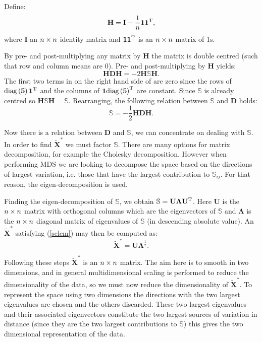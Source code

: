 Define:
\begin{equation}
\mathbf{H} = \mathbf{I}-\frac{1}{n}\bm{1}\bm{1}^{\text{T}},
\end{equation}
where $\mathbf{I}$ an $n \times n$ identity matrix and $\bm{1}\bm{1}^{\text{T}}$ is an $n \times n$ matrix of 1s.

By pre- and post-multiplying any matrix by $\mathbf{H}$ the matrix is double centred (such that row and column means are 0). Pre- and post-multiplying  by $\mathbf{H}$ yields:
\begin{equation}
\mathbf{H}\mathbf{D}\mathbf{H} = -2\mathbf{H}\mathbb{S}\mathbf{H}.
\end{equation}
The first two terms in on the right hand side of  are zero since the rows of $\text{diag}\left(\mathbb{S}\right)\bm{1}^{\text{T}}$ and the columns of  $\bm{1}\text{diag}\left(\mathbb{S}\right)^{\text{T}}$ are constant. Since $\mathbb{S}$ is already centred so $\mathbf{H}\mathbb{S}\mathbf{H}=\mathbb{S}$. Rearranging, the following relation between $\mathbb{S}$ and $\mathbf{D}$ holds:
\begin{equation}
\mathbb{S} = -\frac{1}{2}\mathbf{H}\mathbf{D}\mathbf{H}.
\end{equation}

Now there is a relation between $\mathbf{D}$ and $\mathbb{S}$, we can concentrate on dealing with $\mathbb{S}$. In order to find $\tilde{\mathbf{X}}^{*}$ we must factor $\mathbb{S}$. There are many options for matrix decomposition, for example the Cholesky decomposition. However when performing MDS we are looking to decompose the space based on the directions of largest variation, i.e. those that have the largest contribution to $\mathbb{S}_{ij}$. For that reason, the eigen-decomposition is used.

Finding the eigen-decomposition of $\mathbb{S}$, we obtain $\mathbb{S}=\mathbf{U}\mathbf{\Lambda}\mathbf{U}^{\text{T}}$. Here $\mathbf{U}$ is the $n \times n$ matrix with orthogonal columns which are the eigenvectors of $\mathbb{S}$ and $\mathbf{\Lambda}$ is the $n \times n$ diagonal matrix of eigenvalues of $\mathbb{S}$ (in descending absolute value). An $\tilde{\mathbf{X}}^*$ satisfying (\ref{selem}) may then be computed as:
\begin{equation}
\tilde{\mathbf{X}}^*=\mathbf{U}\mathbf{\Lambda}^{\frac{1}{2}}.
\end{equation}

Following these steps $\tilde{\mathbf{X}}^*$ is an $n \times n$ matrix. The aim here is to smooth in two dimensions, and in general multidimensional scaling is performed to reduce the dimensionality of the data, so we must now reduce the dimensionality of $\tilde{\mathbf{X}}^*$. To represent the space using two dimensions the directions with the two largest eigenvalues are chosen and the others discarded. These two largest eigenvalues and their associated eigenvectors constitute the two largest sources of variation in distance (since they are the two largest contributions to $\mathbb{S}$) this gives the two dimensional representation of the data. 

